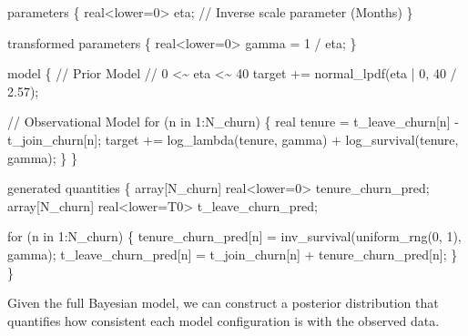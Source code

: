 \documentclass[
  letterpaper,
  DIV=11,
  numbers=noendperiod]{scrartcl}
\newenvironment{Shaded}{\begin{snugshade}}{\end{snugshade}}
\newcommand{\CommentTok}[1]{\textcolor[rgb]{0.37,0.37,0.37}{#1}}
\newcommand{\ControlFlowTok}[1]{\textcolor[rgb]{0.00,0.23,0.31}{#1}}
\newcommand{\DataTypeTok}[1]{\textcolor[rgb]{0.68,0.00,0.00}{#1}}
\newcommand{\DecValTok}[1]{\textcolor[rgb]{0.68,0.00,0.00}{#1}}
\newcommand{\FloatTok}[1]{\textcolor[rgb]{0.68,0.00,0.00}{#1}}
\newcommand{\KeywordTok}[1]{\textcolor[rgb]{0.00,0.23,0.31}{#1}}
\newcommand{\NormalTok}[1]{\textcolor[rgb]{0.00,0.23,0.31}{#1}}
\begin{document}
\begin{codelisting}
\begin{Shaded}
\begin{Highlighting}[]
\KeywordTok{parameters}\NormalTok{ \{}
  \DataTypeTok{real}\NormalTok{\textless{}}\KeywordTok{lower}\NormalTok{=}\DecValTok{0}\NormalTok{\textgreater{} eta; }\CommentTok{// Inverse scale parameter (Months)}
\NormalTok{\}}

\KeywordTok{transformed parameters}\NormalTok{ \{}
  \DataTypeTok{real}\NormalTok{\textless{}}\KeywordTok{lower}\NormalTok{=}\DecValTok{0}\NormalTok{\textgreater{} gamma = }\DecValTok{1}\NormalTok{ / eta;}
\NormalTok{\}}

\KeywordTok{model}\NormalTok{ \{}
  \CommentTok{// Prior Model}
  \CommentTok{// 0 \textless{}\textasciitilde{} eta \textless{}\textasciitilde{} 40}
  \KeywordTok{target +=}\NormalTok{ normal\_lpdf(eta | }\DecValTok{0}\NormalTok{, }\DecValTok{40}\NormalTok{ / }\FloatTok{2.57}\NormalTok{);}

  \CommentTok{// Observational Model}
  \ControlFlowTok{for}\NormalTok{ (n }\ControlFlowTok{in} \DecValTok{1}\NormalTok{:N\_churn) \{}
    \DataTypeTok{real}\NormalTok{ tenure = t\_leave\_churn[n] {-} t\_join\_churn[n];}
    \KeywordTok{target +=}\NormalTok{   log\_lambda(tenure, gamma)}
\NormalTok{              + log\_survival(tenure, gamma);}
\NormalTok{  \}}
\NormalTok{\}}

\KeywordTok{generated quantities}\NormalTok{ \{}
  \DataTypeTok{array}\NormalTok{[N\_churn] }\DataTypeTok{real}\NormalTok{\textless{}}\KeywordTok{lower}\NormalTok{=}\DecValTok{0}\NormalTok{\textgreater{} tenure\_churn\_pred;}
  \DataTypeTok{array}\NormalTok{[N\_churn] }\DataTypeTok{real}\NormalTok{\textless{}}\KeywordTok{lower}\NormalTok{=T0\textgreater{} t\_leave\_churn\_pred;}

  \ControlFlowTok{for}\NormalTok{ (n }\ControlFlowTok{in} \DecValTok{1}\NormalTok{:N\_churn) \{}
\NormalTok{    tenure\_churn\_pred[n]}
\NormalTok{      = inv\_survival(uniform\_rng(}\DecValTok{0}\NormalTok{, }\DecValTok{1}\NormalTok{), gamma);}
\NormalTok{    t\_leave\_churn\_pred[n]}
\NormalTok{      = t\_join\_churn[n] + tenure\_churn\_pred[n];}
\NormalTok{  \}}
\NormalTok{\}}
\end{Highlighting}
\end{Shaded}

\end{codelisting}

Given the full Bayesian model, we can construct a posterior distribution
that quantifies how consistent each model configuration is with the
observed data.
\end{document}
